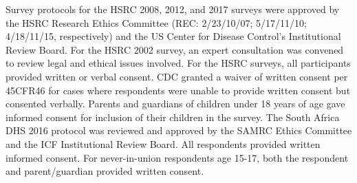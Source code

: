 \documentclass{article}
\begin{document}
Survey protocols for the HSRC 2008, 2012, and 2017 surveys were approved by the HSRC Research Ethics Committee (REC: 2/23/10/07; 5/17/11/10; 4/18/11/15, respectively) and the US Center for Disease Control’s Institutional Review Board. For the HSRC 2002 survey, an expert consultation was convened to review legal and ethical issues involved.  For the HSRC surveys, all participants provided written or verbal consent. CDC granted a waiver of written consent per 45CFR46 for cases where respondents were unable to provide written consent but consented verbally. Parents and guardians of children under 18 years of age gave informed consent for inclusion of their children in the survey. The South Africa DHS 2016 protocol was reviewed and approved by the SAMRC Ethics Committee and the ICF Institutional Review Board. All respondents provided written informed consent. For never-in-union respondents age 15-17, both the respondent and parent/guardian provided written consent.

\newpage 


\printbibliography

\newpage 
\end{document}
